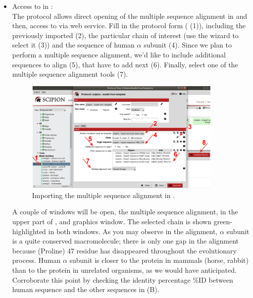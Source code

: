 \begin{itemize}
 \item Access to \modeller in \chimera:\\
 The protocol  allows direct opening of the multiple sequence alignment in \chimera and then, access to \modeller via web service. Fill in the protocol form ( (1)), including the   previously imported (2), the particular chain of interest (use the wizard to select it (3)) and the  sequence of human  $\alpha$ subunit (4). Since we plan to perform a multiple sequence alignment, we'd like to include additional sequences to align (5), that have to add next (6). Finally, select one of the multiple sequence alignment tools (7). 
 
 \begin{figure}[H]
  \centering 
  \captionsetup{width=.7\linewidth} 
  \includegraphics[width=0.90\textwidth]{Images/Fig13}
  \caption{Importing the multiple sequence alignment in \chimera.}
  \label{fig:model_from_template_protocol}
  \end{figure}
 
 A couple of windows will be open, the multiple sequence alignment, in the upper part of , and \chimera graphics window. The  selected chain is shown green-highlighted in both windows. As you may observe in the alignment,  $\alpha$ subunit is a quite conserved macromolecule; there is only one gap in the alignment because  (Proline) 47 residue has disappeared throughout the evolutionary process. Human  $\alpha$ subunit is closer to the protein in mammals (horse, rabbit) than to the protein in unrelated organisms, as we would have anticipated. Corroborate this point by checking the identity percentage \%ID  between human sequence and the other sequences in  (B). 
 

\end{itemize}
